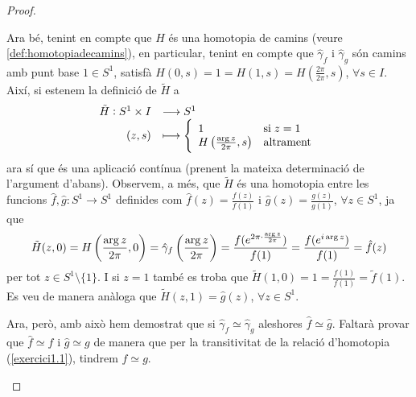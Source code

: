 \documentclass[../main.tex]{subfiles}
\begin{document}
\begin{proof}
\begin{enumerate}[($\Leftarrow$)]
    Ara bé, tenint en compte que $H$ és una homotopia de camins (veure \ref{def:homotopiadecamins}), en particular, tenint en compte que $\hat{\gamma}_f$ i $\hat{\gamma}_g$ són camins amb punt base $1\in S^1$, satisfà $H(0,s) = 1 = H(1,s) = H(\frac{2\pi}{2\pi},s)$, $\forall s\in I$. Així, si estenem la definició de $\tilde{H}$ a 
    \begin{equation}
        \notag
        \begin{array}{rl}
            \tilde{H}:S^1\times I & \longrightarrow S^1 \\
            (z,s) & \longmapsto \left\{
            \begin{array}{ll}
                1 & \mathrm{si}\;z=1 \\
                H\left(\frac{\arg z}{2\pi},s\right) & \mathrm{altrament}
            \end{array}
            \right.
        \end{array}
    \end{equation}
    ara sí que és una aplicació contínua (prenent la mateixa determinació de l'argument d'abans). Observem, a més, que $\tilde{H}$ és una homotopia entre les funcions $\hat{f},\hat{g}:S^1\rightarrow S^1$ definides com $\hat{f}(z) = \frac{f(z)}{f(1)}$ i $\hat{g}(z) = \frac{g(z)}{g(1)}$, $\forall z\in S^1$, ja que
    \begin{equation}
        \notag
        \tilde{H}(z,0) = H\left(\frac{\arg z}{2\pi},0\right) = \hat{\gamma}_f\left(\frac{\arg z}{2\pi}\right)=\frac{f(e^{2\pi\cdotp\frac{\arg z}{2\pi}})}{f(1)} = \frac{f(e^{i\arg z})}{f(1)} = \hat{f}(z)
    \end{equation}
    per tot $z\in S^1\setminus\{1\}$. I si $z = 1$ també es troba que $\tilde{H}(1,0) = 1 = \frac{f(1)}{f(1)} = \tilde{f}(1)$. Es veu de manera anàloga que $\tilde{H}(z,1) = \hat{g}(z)$, $\forall z\in S^1$.
    
    Ara, però, amb això hem demostrat que si $\hat{\gamma}_f\simeq \hat{\gamma}_g$ aleshores $\hat{f}\simeq \hat{g}$. Faltarà provar que $\hat{f}\simeq f$ i $\hat{g}\simeq g$ de manera que per la transitivitat de la relació d'homotopia (\ref{exercici1.1}), tindrem $f\simeq g$.
    

\end{enumerate}
\end{proof}
\end{document}
